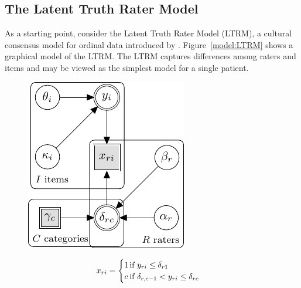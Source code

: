 \documentclass[a4paper,usenames,dvipsnames]{article}
\begin{document}
\subsection*{The Latent Truth Rater Model}
As a starting point, consider the Latent Truth Rater Model (LTRM), a cultural consensus model for ordinal data introduced by \AB{}. Figure~\ref{model:LTRM} shows a graphical model of the LTRM. The LTRM captures differences among raters and items and may be viewed as the simplest model for a single patient.
\begin{figure}[!ht]
	\begin{minipage}{0.5\textwidth}
		\centering
		\includegraphics[width=\textwidth, page=7]{graphicalModels/graphicalModels.pdf}
		\end{minipage}\hfill
	\begin{minipage}{0.5\textwidth}
		{\normalsize
		\begin{align*}
			x_{\Irater\Iitem} &\assignment
			\begin{cases}
			1		&\hspace{-.3cm} \text{if } \Appraisal_{\Irater\Iitem} \leq \Threshold_{\Irater 1} \\
			\Incat	&\hspace{-.3cm} \text{if } \Threshold_{\Irater, \Incat-1} < \Appraisal_{\Irater\Iitem} \leq \Threshold_{\Irater\Incat} \\

\end{cases}
\end{align*}}
\end{minipage}
\end{figure}
\end{document}
